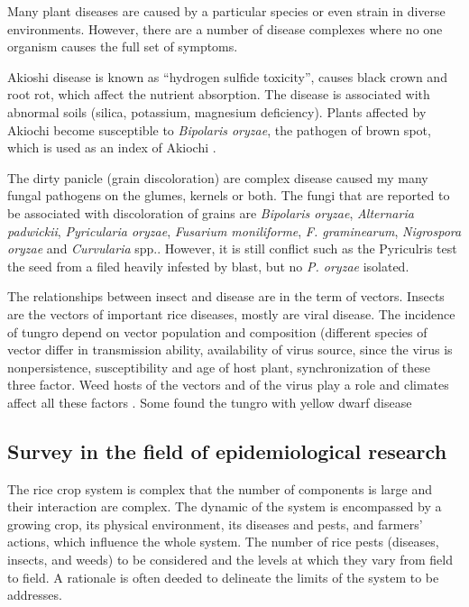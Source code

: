 Many plant diseases are caused by a particular species or even strain in diverse environments. However, there are a number of disease complexes where no one organism causes the full set of symptoms.

Akioshi disease is known as ``hydrogen sulfide toxicity'', causes black crown and root rot, which affect the nutrient absorption. The disease is associated with abnormal soils (silica, potassium, magnesium deficiency). Plants affected by Akiochi become susceptible to \textit{Bipolaris oryzae}, the pathogen of brown spot, which is used as an index of Akiochi \citep{ouricedisease}.

The dirty panicle (grain discoloration) are complex disease caused my many fungal pathogens on the glumes, kernels or both. The fungi that are reported to be associated with discoloration of grains are \textit{Bipolaris oryzae}, \textit{Alternaria padwickii}, \textit{Pyricularia oryzae}, \textit{Fusarium moniliforme}, \textit{F. graminearum}, \textit{Nigrospora oryzae} and \textit{Curvularia} spp.\cite{ouricedisease}. However, it is still conflict such as the Pyriculris test the seed from a filed heavily infested by blast, but no \textit{P. oryzae} isolated.

The relationships between insect and disease are in the term of vectors. Insects are the vectors of important rice diseases, mostly are viral disease. The incidence of tungro depend on vector population and composition (different species of vector differ in transmission ability, availability of virus source, since the virus is nonpersistence, susceptibility and age of host plant, synchronization of these three factor. Weed hosts of the vectors and of the virus play a role and climates affect all these factors \cite{naganagoud2010studies}. Some found the tungro with yellow dwarf disease \cite{ouricedisease}

\subsection*{Survey in the field of epidemiological research}

The rice crop system is complex that the number of components is large and their interaction are complex. The dynamic of the system is encompassed by a growing crop, its physical environment, its diseases and pests, and farmers' actions, which influence the whole system. The number of rice pests (diseases, insects, and weeds) to be considered and the levels at which they vary from field to field. A rationale is often deeded to delineate the limits of the system to be addresses.

